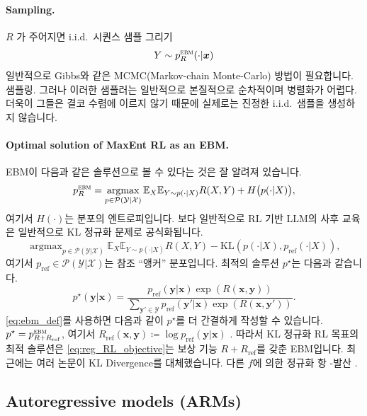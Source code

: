 \documentclass{article}
\def\x{{\bm{x}}}
\def\y{{\bm{y}}}
\def\EE{{\mathbb{E}}}
\def\cP{{\mathcal{P}}}
\def\cX{{\mathcal{X}}}
\def\cY{{\mathcal{Y}}}
\def\ebm{{\textsc{ebm}}}
\def\iid{{i.i.d.\ }}
\def\pref{p_{\mathrm{ref}}}
\DeclareMathOperator*{\argmax}{argmax}
\begin{document}
\paragraph{Sampling.}

$R$ 가 주어지면 \iid 시퀀스 샘플 그리기
 \begin{equation} 
Y \sim p^ \ebm _R( \cdot | \x )
 \end{equation} 
일반적으로 Gibbs와 같은 MCMC(Markov-chain Monte-Carlo) 방법이 필요합니다.
샘플링. 그러나 이러한 샘플러는 일반적으로 본질적으로 순차적이며
병렬화가 어렵다. 더욱이 그들은 결코 수렴에 이르지 않기 때문에
실제로는 진정한 \iid 샘플을 생성하지 않습니다.

\paragraph{Optimal solution of MaxEnt RL as an EBM.}

EBM이 다음과 같은 솔루션으로 볼 수 있다는 것은 잘 알려져 있습니다.
 \begin{equation} 
p^ \ebm _R = \argmax _{p \in \cP ( \cY | \cX )} 
 \EE _X \EE _{Y \sim p( \cdot | X)} R(X, Y) + H \big (p( \cdot |X) \big ),
 \end{equation} 
여기서 $H(\cdot)$는 분포의 엔트로피입니다. 보다 일반적으로 RL 기반
LLM의 사후 교육은 일반적으로 KL 정규화 문제로 공식화됩니다. 
 \citep{ziegler2019fine,stiennon2020learning,ouyang2022training} 
 \begin{equation} 
 \argmax _{p \in \cP ( \cY | \cX )} 
 \EE _X \EE _{Y \sim p( \cdot | X)} R(X, Y) - \mathrm{KL} (p( \cdot |X), \pref ( \cdot |X)),
 \label{eq:reg_RL_objective} 
 \end{equation} 
여기서 $\pref \in \cP(\cY|\cX)$는 참조 ``앵커'' 분포입니다.
최적의 솔루션 $p^\star$는 다음과 같습니다.
 \begin{equation} 
p^ \star ( \y | \x ) = \frac{\pref(\y|\x) \exp(R(\x, \y))} {
 \sum _{ \y ' \in \cY } \pref ( \y '| \x ) \exp (R( \x , \y '))
}.
 \end{equation} 
\eqref{eq:ebm_def}를 사용하면 다음과 같이 $p^\star$를 더 간결하게 작성할 수 있습니다.
 $p^\star = p^\ebm_{R + R_\mathrm{ref}}$,
여기서 $R_\mathrm{ref}(\x, \y) \coloneqq \log \pref(\y | \x)$ .
따라서 KL 정규화 RL 목표의 최적 솔루션은
 \eqref{eq:reg_RL_objective}는 보상 기능 $R +
R_\mathrm{ref}$를 갖춘 EBM입니다.  최근에는 여러 논문이 KL Divergence를 대체했습니다.
다른 $f$에 의한 정규화 항 -발산 
 \citep{go2023aligning,wang2023beyond,roulet2025loss,sander2025joint} .

\subsection{Autoregressive models (ARMs)}
\end{document}
